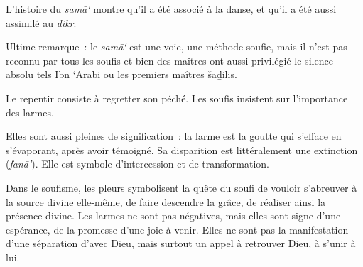 L'histoire du \emph{samā`} montre qu'il a été associé à la danse, et
qu'il a été aussi assimilé au \emph{ḏikr}.

Ultime remarque~: le \emph{samā`} est une voie, une méthode soufie, mais
il n'est pas reconnu par tous les soufis et bien des maîtres ont aussi
privilégié le silence absolu tels Ibn `Arabi ou les premiers maîtres
šāḏilis.


Le repentir consiste à regretter son péché. Les soufis insistent sur
l'importance des larmes.

Elles sont aussi pleines de signification~: la larme est la goutte qui
s'efface en s'évaporant, après avoir témoigné. Sa disparition est
littéralement une extinction (\emph{fanā'}). Elle est symbole
d'intercession et de transformation.

Dans le soufisme, les pleurs symbolisent la quête du soufi de vouloir
s'abreuver à la source divine elle-même, de faire descendre la grâce, de
réaliser ainsi la présence divine. Les larmes ne sont pas négatives,
mais elles sont signe d'une espérance, de la promesse d'une joie à
venir. Elles ne sont pas la manifestation d'une séparation d'avec Dieu,
mais surtout un appel à retrouver Dieu, à s'unir à lui.


